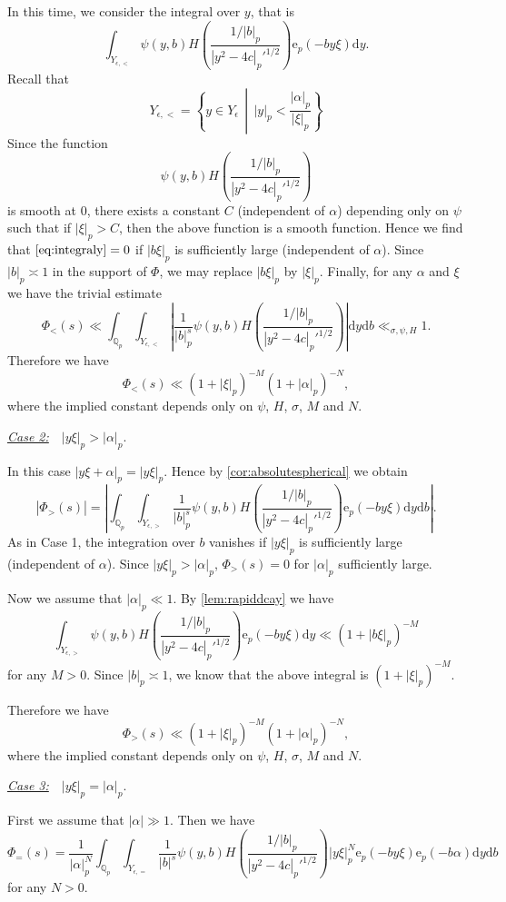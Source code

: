 \documentclass[10pt,oneside,reqno]{amsart}
\makeatletter
\newcommand\rmd{\mathrm{d}}
\newcommand\rme{\mathrm{e}}
\newcommand\QQ{\mathbb{Q}}
\newcommand\legendresymbol[2]{\genfrac{(}{)}{}{}{#1}{#2}}
\theoremstyle{THEOREM}
\theoremstyle{DEFINITION}
\theoremstyle{EXERCISE}
\numberwithin{equation}{section}
\renewenvironment{proof}[1][\proofname]{\par
  \vspace{-6pt}
  \pushQED{\qed}
  \normalfont \topsep6\p@\@plus6\p@\relax
  \trivlist
  \item[\hskip\labelsep\rmfamily\bfseries
    #1\@addpunct{:}]\ignorespaces
}{
  \popQED\endtrivlist\@endpefalse
  \vspace{-6pt}
}
\makeatother
\begin{document}
\begin{proof}[Proof of \autoref{thm:nonarchimedeanintegralestimate}]
In this time, we consider the integral over $y$, that is
\begin{equation}\label{eq:integraly}
\int_{Y_{\epsilon,<}}\psi(y,b)H\legendresymbol {1/|b|_p}{|y^2-4c|_p'^{1/2}}\rme_p(-by\xi)\rmd y.
\end{equation}
Recall that
\[
Y_{\epsilon,<}=\left\{y\in Y_\epsilon\,\middle|\, |y|_p<\frac{|\alpha|_p}{|\xi|_p}\right\}
\]
Since the function
\[
\psi(y,b)H\legendresymbol {1/|b|_p}{|y^2-4c|_p'^{1/2}}
\]
is smooth at $0$, there exists a constant $C$ (independent of $\alpha$) depending only on $\psi$ such that if $|\xi|_p>C$, then the above function is a smooth function. Hence we find that $\eqref{eq:integraly}=0$ if $|b\xi|_p$ is sufficiently large (independent of $\alpha$). Since $|b|_p\asymp 1$ in the support of $\Phi$, we may replace $|b\xi|_p$ by $|\xi|_p$. Finally, for any $\alpha$ and $\xi$ we have the trivial estimate
\[
\Phi_<(s)\ll\int_{\QQ_p}\int_{Y_{\epsilon,<}}\left|\frac{1}{|b|_p^{s}}\psi(y,b)H\legendresymbol {1/|b|_p}{|y^2-4c|_p'^{1/2}}\right|\rmd y\rmd b\ll_{\sigma,\psi,H} 1.
\]
Therefore we have
\[
\Phi_<(s)\ll (1+|\xi|_p)^{-M}(1+|\alpha|_p)^{-N},
\]
where the implied constant depends only on $\psi$, $H$, $\sigma$, $M$ and $N$. 

\underline{\emph{Case 2:}}\ \ $|y\xi|_p>|\alpha|_p$.

In this case $|y\xi+\alpha|_p=|y\xi|_p$. Hence by \autoref{cor:absolutespherical} we obtain
\[
|\Phi_>(s)|=\left|\int_{\QQ_p}\int_{Y_{\epsilon,>}}\frac{1}{|b|_p^{s}}\psi(y,b)H\legendresymbol {1/|b|_p}{|y^2-4c|_p'^{1/2}}\rme_p(-by\xi)\rmd y\rmd b\right|.
\]
As in Case 1, the integration over $b$ vanishes if $|y\xi|_p$ is sufficiently large (independent of $\alpha$). Since $|y\xi|_p>|\alpha|_p$, $\Phi_>(s)=0$ for $|\alpha|_p$ sufficiently large. 

Now we assume that $|\alpha|_p\ll 1$. By \autoref{lem:rapiddcay} we have
\[
\int_{Y_{\epsilon,>}}\psi(y,b)H\legendresymbol {1/|b|_p}{|y^2-4c|_p'^{1/2}}\rme_p(-by\xi)\rmd y\ll (1+|b\xi|_p)^{-M}
\]
for any $M>0$. Since $|b|_p\asymp 1$, we know that the above integral is $(1+|\xi|_p)^{-M}$.

Therefore we have
\[
\Phi_>(s)\ll (1+|\xi|_p)^{-M}(1+|\alpha|_p)^{-N},
\]
where the implied constant depends only on $\psi$, $H$, $\sigma$, $M$ and $N$. 

\underline{\emph{Case 3:}}\ \ $|y\xi|_p=|\alpha|_p$.

First we assume that $|\alpha|\gg 1$. Then we have
\[
\Phi_=(s)=\frac{1}{|\alpha|_p^N}\int_{\QQ_p}\int_{Y_{\epsilon,=}}\frac{1}{|b|^s}\psi(y,b)H\legendresymbol{1/|b|_p }{|y^2-4c|_p'^{1/2}}|y\xi|_p^N\rme_p(-by\xi)\rme_p(-b\alpha)\rmd y\rmd b
\]
for any $N>0$.


\end{proof}
\end{document}
